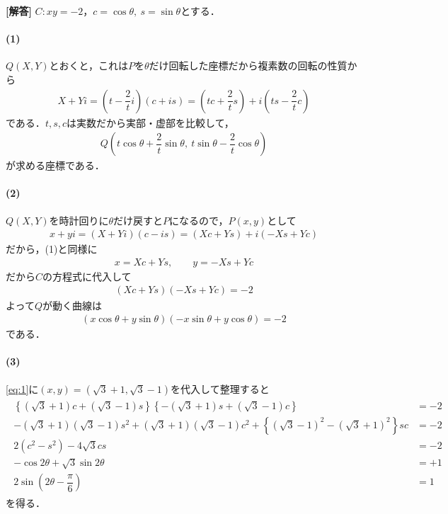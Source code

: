 \documentclass[../../main.tex]{subfiles}
\begin{document}
\begin{oframed}
  
\end{oframed}

{\bf [解答]}
$C: xy=-2$，$c=\cos\theta,\ s=\sin\theta$とする．

\paragraph{(1)}
$Q(X,Y)$とおくと，これは$P$を$\theta$だけ回転した座標だから複素数の回転の性質から
\begin{align}
  X+Yi=\left(t-\dfrac{2}{t}i\right)(c+is)=\left(tc+\dfrac{2}{t}s\right)+i\left(ts-\dfrac{2}{t}c\right)
\end{align}
である．$t,s,c$は実数だから実部・虚部を比較して，
\begin{align}
  Q\left(t\cos\theta+\dfrac{2}{t}\sin\theta,\ t\sin\theta-\dfrac{2}{t}\cos\theta\right)
\end{align}
が求める座標である．

\paragraph{(2)}
$Q(X,Y)$を時計回りに$\theta$だけ戻すと$P$になるので，$P(x,y)$として
\begin{align}
  x+yi=(X+Yi)(c-is)=(Xc+Ys)+i(-Xs+Yc)
\end{align}
だから，(1)と同様に
\begin{align}
  x=Xc+Ys, \qquad y=-Xs+Yc
\end{align}
だから$C$の方程式に代入して
\begin{align}
  (Xc+Ys)(-Xs+Yc)=-2
\end{align}
よって$Q$が動く曲線は
\begin{align}
  (x\cos\theta+y\sin\theta)(-x\sin\theta+y\cos\theta)=-2 \label{eq:1}
\end{align}
である．

\paragraph{(3)}

\cref{eq:1}に$(x,y)=(\sqrt{3}+1,\sqrt{3}-1)$を代入して整理すると
\begin{align}
  \begin{split}
    \left\{(\sqrt{3}+1)c+(\sqrt{3}-1)s\right\}\left\{-(\sqrt{3}+1)s+(\sqrt{3}-1)c\right\}&=-2 \\
    -(\sqrt{3}+1)(\sqrt{3}-1)s^2+(\sqrt{3}+1)(\sqrt{3}-1)c^2+\left\{(\sqrt{3}-1)^2-(\sqrt{3}+1)^2\right\}sc&=-2 \\
    2(c^2-s^2)-4\sqrt{3}cs&=-2 \\
    -\cos2\theta+\sqrt{3}\sin2\theta&=+1 \\
    2\sin\left(2\theta-\dfrac{\pi}{6}\right)&=1
  \end{split} \label{eq:2}
\end{align}
を得る．
\end{document}
